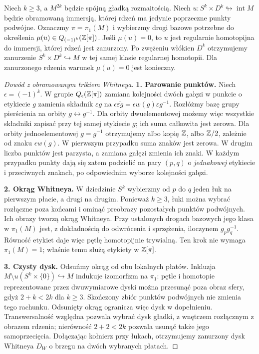 \begin{stwierdzenie}
\label{prop:osadzenie-Wall-52-22}
Niech $k\geq3$, a $M^{2k}$ będzie spójną gładką
rozmaitością. Niech $u:S^k\times D^k\looparrowright
\operatorname{int}M$ będzie obramowaną immersją,
której rdzeń ma jedynie poprzeczne punkty podwójne.
Oznaczmy $\pi=\pi_1(M)$ i wybierzmy drogi bazowe
potrzebne do określenia
$\mu(u)\in Q_{(-1)^k}(\mathbb{Z}[\pi])$.
Jeśli $\mu(u)=0$, to $u$ jest regularnie homotopijna
do immersji, której rdzeń jest zanurzony. Po
zwężeniu włókien $D^k$ otrzymujemy zanurzenie
$S^k\times D^k\hookrightarrow M$ w tej samej
klasie regularnej homotopii. Dla zanurzonego rdzenia
warunek $\mu(u)=0$ jest konieczny.
\end{stwierdzenie}
\begin{proof}[Dowód z obramowanym trikiem Whitneya]
\textbf{1. Parowanie punktów.}
Niech $\epsilon=(-1)^k$. W grupie
$Q_\epsilon(\mathbb{Z}[\pi])$ zamiana kolejności dwóch
gałęzi w punkcie o etykiecie $g$ zamienia składnik
$\varepsilon g$ na $\epsilon\overline{\varepsilon g}
=\epsilon w(g)\varepsilon g^{-1}$.
Rozłóżmy bazę grupy pierścienia na orbity
$g\leftrightarrow g^{-1}$. Dla orbity dwuelementowej
możemy więc wszystkie składniki zapisać przy tej
samej etykiecie $g$; ich suma całkowita jest zerowa.
Dla orbity jednoelementowej $g=g^{-1}$ otrzymujemy
albo kopię $\mathbb{Z}$, albo $\mathbb{Z}/2$, zależnie od znaku
$\epsilon w(g)$. W pierwszym przypadku suma znaków
jest zerowa. W drugim liczba punktów jest parzysta,
a zamiana gałęzi zmienia ich znaki. W każdym
przypadku punkty dają się zatem podzielić na pary
$(p,q)$ o \emph{jednakowej} etykiecie i przeciwnych
znakach, po odpowiednim wyborze kolejności gałęzi.

\textbf{2. Okrąg Whitneya.}
W dziedzinie $S^k$ wybierzmy od $p$ do $q$ jeden
łuk na pierwszym płacie, a drugi na drugim.
Ponieważ $k\geq3$, łuki można wybrać rozłączne
poza końcami i ominąć preobrazy pozostałych
punktów podwójnych. Ich obrazy tworzą okrąg
Whitneya. Przy ustalonych drogach bazowych jego
klasa w $\pi_1(M)$ jest, z dokładnością do
odwrócenia i sprzężenia, iloczynem $g_p g_q^{-1}$.
Równość etykiet daje więc pętlę homotopijnie
trywialną. Ten krok nie wymaga $\pi_1(M)=1$;
właśnie temu służą etykiety w $\mathbb{Z}[\pi]$.

\textbf{3. Czysty dysk.}
Odsuńmy okrąg od obu lokalnych płatów. Inkluzja
$M\setminus u(S^k\times\{0\})\hookrightarrow M$
indukuje izomorfizm na $\pi_1$: pętle i homotopie
reprezentowane przez dwuwymiarowe dyski można
przesunąć poza obraz sfery, gdyż
$2+k<2k$ dla $k\geq3$. Skończony zbiór punktów
podwójnych nie zmienia tego rachunku. Odsunięty
okrąg ogranicza więc dysk w dopełnieniu.
Transwersalność względna pozwala wybrać dysk
gładki, z wnętrzem rozłącznym z obrazem rdzenia;
nierówność $2+2<2k$ pozwala usunąć także jego
samoprzecięcia. Dołączając kołnierz przy łukach,
otrzymujemy zanurzony dysk Whitneya $D_W$ o brzegu
na dwóch wybranych płatach.


\end{proof}
